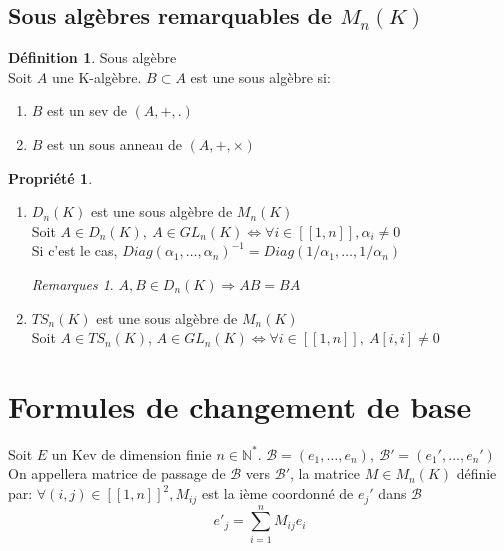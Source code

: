\documentclass[fleqn]{article}
\theoremstyle{definition} \newtheorem*{defi}{D\'efinition}
\theoremstyle{definition} \newtheorem*{theo}{Th\'eor\`eme}
\theoremstyle{definition} \newtheorem*{coro}{Corollaire}
\theoremstyle{definition} \newtheorem*{nota}{Notation}
\theoremstyle{definition} \newtheorem*{vocab}{Vocabulaire}
\theoremstyle{remark} \newtheorem*{rqs}{Remarques}
\theoremstyle{definition} \newtheorem*{prop}{Propri\'et\'e}
\begin{document}
\subsection{Sous alg\`ebres remarquables de $M_n(K)$}
\begin{defi} Sous alg\`ebre \\
	Soit $A$ une K-alg\`ebre. $B \subset A$ est une sous alg\`ebre si:
	\begin{enumerate}
		\item $B$ est un sev de $(A, +, .)$
		\item $B$ est un sous anneau de $(A,+,\times)$
	\end{enumerate}
\end{defi}

\begin{prop} $ $
	\begin{enumerate}
		\item $D_n(K)$ est une sous alg\`ebre de $M_n(K)$\\
			Soit $A \in D_n(K),\ A \in GL_n(K) \Leftrightarrow \forall i \in [\![1,n]\!], \alpha_i \neq 0$\\
			Si c'est le cas, $Diag(\alpha_1, \hdots, \alpha_n)^{-1} = Diag(1/\alpha_1, \hdots, 1/\alpha_n)$
			\begin{rqs} $A,B \in D_n(K) \Rightarrow AB = BA$ \end{rqs}
		\item $TS_n(K)$ est une sous alg\`ebre de $M_n(K)$ \\
			Soit $A \in TS_n(K)$, $A \in GL_n(K) \Leftrightarrow \forall i \in [\![1,n]\!],\ A[i,i] \neq 0$
	\end{enumerate}
\end{prop}

\section{Formules de changement de base}
Soit $E$ un Kev de dimension finie $n \in \mathbb{N}^*$. $\mathscr{B} = (e_1, \hdots, e_n),\ \mathscr{B}' = (e_1', \hdots, e_n')$ \\
On appellera matrice de passage de $\mathscr{B}$ vers $\mathscr{B}'$, la matrice $M \in M_n(K)$ d\'efinie par: $\forall (i,j) \in [\![1,n]\!]^2,
M_{ij}$ est la i\`eme coordonn\'e de $e_j'$ dans $\mathscr{B}$
\[e'_j = \sum_{i=1}^n M_{ij}e_i\]
\end{document}
